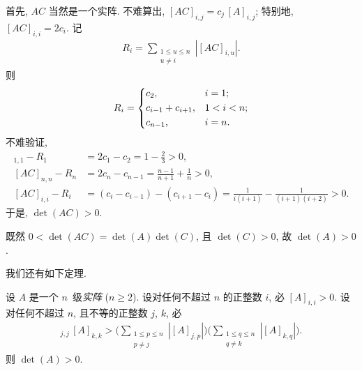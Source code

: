 \begin{example}[continues=emp:NonzeroDet3]
    首先, \(AC\) 当然是一个实阵.
    不难算出, \([AC]_{i,j} = c_j\, [A]_{i,j}\);
    特别地, \([AC]_{i,i} = 2c_i\).
    记
    \begin{align*}
        R_i = \sum_{\substack{1 \leq u \leq n \\ u \neq i}}
        {|[AC]_{i,u}|}.
    \end{align*}
    则
    \begin{align*}
        R_i =
        \begin{dcases}
            c_2,               & i = 1;     \\
            c_{i-1} + c_{i+1}, & 1 < i < n; \\
            c_{n-1},           & i = n.
        \end{dcases}
    \end{align*}
    不难验证,
    \begin{align*}
        [AC]_{1,1} - R_1
         & = 2c_1 - c_2
        = 1 - \frac{2}{3} > 0,                 \\
        [AC]_{n,n} - R_n
         & = 2c_n - c_{n-1}
        = \frac{n-1}{n+1} + \frac{1}{n} > 0,   \\
        [AC]_{i,i} - R_i
         & = (c_i - c_{i-1}) - (c_{i+1} - c_i)
        = \frac{1}{i(i+1)} - \frac{1}{(i+1)(i+2)} > 0.
    \end{align*}
    于是, \(\det {(AC)} > 0\).

    既然 \(0 < \det {(AC)} = \det {(A)} \det {(C)}\),
    且 \(\det {(C)} > 0\),
    故 \(\det {(A)} > 0\).
\end{example}

我们还有如下定理.

\begin{theorem}
    设 \(A\) 是一个 \(n\)~级\emph{实阵} (\(n \geq 2\)).
    设对任何不超过 \(n\) 的正整数 \(i\), 必
    \([A]_{i,i} > 0\).
    设对任何不超过 \(n\), 且不等的正整数 \(j\), \(k\), 必
    \begin{align*}
        [A]_{j,j}\,[A]_{k,k} >
        \Bigg(
        \sum_{\substack{1 \leq p \leq n \\
                p \neq j}} {|[A]_{j,p}|}
        \Bigg)
        \Bigg(
        \sum_{\substack{1 \leq q \leq n \\
                q \neq k}} {|[A]_{k,q}|}
        \Bigg).
    \end{align*}
    则 \(\det {(A)} > 0\).
\end{theorem}

